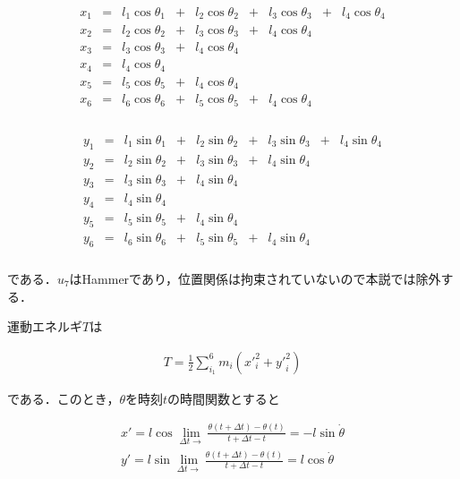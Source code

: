 \begin{eqnarray}
    \begin{matrix}
        x_1 &=& l_1 \cos \theta_1 &+& l_2 \cos \theta_2 &+& l_3 \cos \theta_3 &+& l_4 \cos \theta_4\\
        x_2 &=& l_2 \cos \theta_2 &+& l_3 \cos \theta_3 &+& l_4 \cos \theta_4 & & \\
        x_3 &=& l_3 \cos \theta_3 &+& l_4 \cos \theta_4 & & & &\\
        x_4 &=& l_4 \cos \theta_4 & & & & & &\\
        x_5 &=& l_5 \cos \theta_5 &+& l_4 \cos \theta_4 & & & &\\
        x_6 &=& l_6 \cos \theta_6 &+& l_5 \cos \theta_5 &+& l_4 \cos \theta_4 & &\\
    \end{matrix}
\end{eqnarray}

\begin{eqnarray}
    \begin{matrix}
        y_1 &=& l_1 \sin \theta_1 &+& l_2 \sin \theta_2 &+& l_3 \sin \theta_3 &+& l_4 \sin \theta_4\\
        y_2 &=& l_2 \sin \theta_2 &+& l_3 \sin \theta_3 &+& l_4 \sin \theta_4 & & \\
        y_3 &=& l_3 \sin \theta_3 &+& l_4 \sin \theta_4 & & & &\\
        y_4 &=& l_4 \sin \theta_4 & & & & & &\\
        y_5 &=& l_5 \sin \theta_5 &+& l_4 \sin \theta_4 & & & &\\
        y_6 &=& l_6 \sin \theta_6 &+& l_5 \sin \theta_5 &+& l_4 \sin \theta_4 & & \\
    \end{matrix}
\end{eqnarray}

である．$u_7$はHammerであり，位置関係は拘束されていないので本説では除外する．

運動エネルギ$T$は

\begin{eqnarray}
    \label{math:lagrange-T}
    T = \frac{1}{2} \sum^6_{i_1} m_i({x'}_i^2 + {y'}_i^2)
\end{eqnarray}

である．このとき，$\theta$を時刻$t$の時間関数とすると

\begin{eqnarray}
    x' = l \cos \lim_{\Delta t \rightarrow } \frac{\theta(t+\Delta t) - \theta(t)}{t + \Delta t - t} = - l \sin \dot{\theta}\\
    y' = l \sin \lim_{\Delta t \rightarrow } \frac{\theta(t+\Delta t) - \theta(t)}{t + \Delta t - t} = l \cos \dot{\theta}\\
\end{eqnarray}

